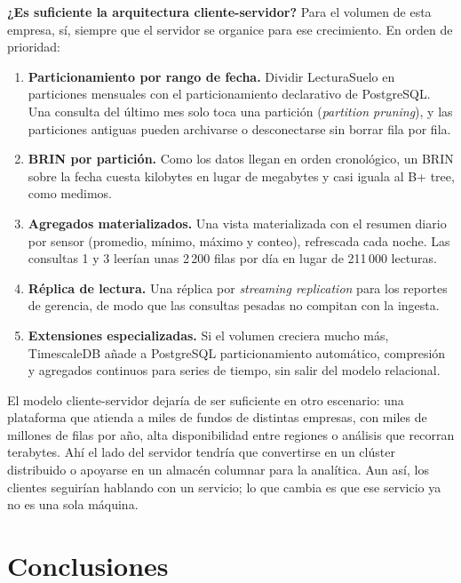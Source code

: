 \documentclass[11pt,letterpaper]{article}
\newcommand{\tbus}{\textunderscore\allowbreak}
\newcommand{\tb}[1]{{\ttfamily\let\_\tbus #1}}
\begin{document}
\textbf{¿Es suficiente la arquitectura cliente-servidor?} Para el volumen de esta empresa, sí, siempre que el servidor se organice para ese crecimiento. En orden de prioridad:

\begin{enumerate}[leftmargin=1.6em,itemsep=0.15em]
\item \textbf{Particionamiento por rango de fecha.} Dividir \tb{Lectura\_Suelo} en particiones mensuales con el particionamiento declarativo de PostgreSQL. Una consulta del último mes solo toca una partición (\emph{partition pruning}), y las particiones antiguas pueden archivarse o desconectarse sin borrar fila por fila.
\item \textbf{BRIN por partición.} Como los datos llegan en orden cronológico, un BRIN sobre la fecha cuesta kilobytes en lugar de megabytes y casi iguala al B+ tree, como medimos.
\item \textbf{Agregados materializados.} Una vista materializada con el resumen diario por sensor (promedio, mínimo, máximo y conteo), refrescada cada noche. Las consultas 1 y 3 leerían unas 2\,200 filas por día en lugar de 211\,000 lecturas.
\item \textbf{Réplica de lectura.} Una réplica por \emph{streaming replication} para los reportes de gerencia, de modo que las consultas pesadas no compitan con la ingesta.
\item \textbf{Extensiones especializadas.} Si el volumen creciera mucho más, TimescaleDB añade a PostgreSQL particionamiento automático, compresión y agregados continuos para series de tiempo, sin salir del modelo relacional.
\end{enumerate}

El modelo cliente-servidor dejaría de ser suficiente en otro escenario: una plataforma que atienda a miles de fundos de distintas empresas, con miles de millones de filas por año, alta disponibilidad entre regiones o análisis que recorran terabytes. Ahí el lado del servidor tendría que convertirse en un clúster distribuido o apoyarse en un almacén columnar para la analítica. Aun así, los clientes seguirían hablando con un servicio; lo que cambia es que ese servicio ya no es una sola máquina.

\section{Conclusiones}
\end{document}
